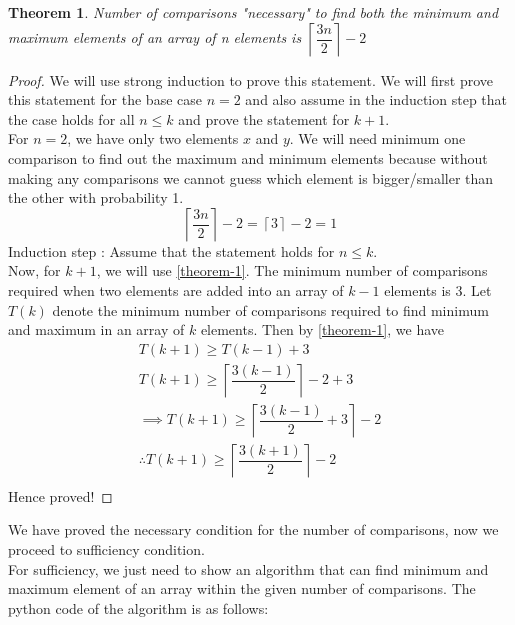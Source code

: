 \documentclass[14pt]{article}
\newtheorem{theorem}{Theorem}
\begin{document}
		\begin{theorem}
			Number of comparisons "necessary" to find both the minimum and maximum elements of an array of n elements is $\left \lceil \dfrac{3n}{2} \right\rceil - 2$
		\end{theorem} 
		\begin{proof}
			We will use strong induction to prove this statement. We will first prove this statement for the base case $n=2$ and also assume in the induction step that the case holds for all $n \leq k$ and prove the statement for $k+1$.\\
			\linebreak
			For $n=2$, we have only two elements $x$ and $y$. We will need minimum one comparison to find out the maximum and minimum elements because without making any comparisons we cannot guess which element is bigger/smaller than the other with probability 1. 
			$$\left \lceil \dfrac{3n}{2} \right\rceil - 2 = \left \lceil 3\right \rceil - 2 = 1$$
			\linebreak
			Induction step : Assume that the statement holds for $n \leq k$.\\
			\linebreak
			Now, for $k+1$, we will use \ref{theorem-1}. The minimum number of comparisons required when two elements are added into an array of $k-1$ elements is 3. Let $T(k)$ denote the minimum number of comparisons required to find minimum and maximum in an array of $k$ elements. Then by \ref{theorem-1}, we have 
			\begin{align*}
				T(k+1) \geq T(k-1) + 3\\
				T(k+1) \geq \left \lceil \dfrac{3(k-1)}{2} \right\rceil - 2 + 3\\
				\implies T(k+1) \geq \left \lceil \dfrac{3(k-1)}{2} + 3\right\rceil - 2\\
				\therefore T(k+1) \geq \left \lceil \dfrac{3(k+1)}{2}\right\rceil - 2\\
			\end{align*}
		Hence proved!
		\end{proof}
		We have proved the necessary condition for the number of comparisons, now we proceed to sufficiency condition.\\
		\linebreak
		For sufficiency, we just need to show an algorithm that can find minimum and maximum element of an array within the given number of comparisons. The python code of the algorithm is as follows:
		\newpage
\end{document}
